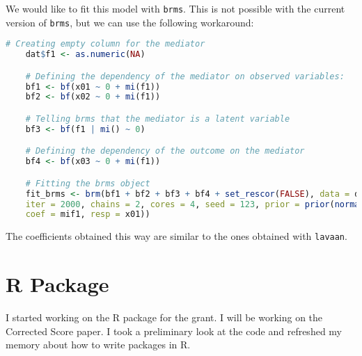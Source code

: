 \documentclass{article}
\begin{document}
We would like to fit this model with \texttt{brms}. 
This is not possible with the current version of \texttt{brms}, but we can use the following workaround:

\begin{lstlisting}[language=R]
    # Creating empty column for the mediator
    dat$f1 <- as.numeric(NA)

    # Defining the dependency of the mediator on observed variables: 
    bf1 <- bf(x01 ~ 0 + mi(f1))
    bf2 <- bf(x02 ~ 0 + mi(f1))

    # Telling brms that the mediator is a latent variable
    bf3 <- bf(f1 | mi() ~ 0)

    # Defining the dependency of the outcome on the mediator
    bf4 <- bf(x03 ~ 0 + mi(f1))

    # Fitting the brms object 
    fit_brms <- brm(bf1 + bf2 + bf3 + bf4 + set_rescor(FALSE), data = dat, 
    iter = 2000, chains = 2, cores = 4, seed = 123, prior = prior(normal(1, 0.00001), 
    coef = mif1, resp = x01))
\end{lstlisting}

The coefficients obtained this way are similar to the ones obtained with \texttt{lavaan}.

\section{R Package}

I started working on the R package for the grant. 
I will be working on the Corrected Score paper. 
I took a preliminary look at the code and refreshed my memory about how to write packages in R.
\end{document}
